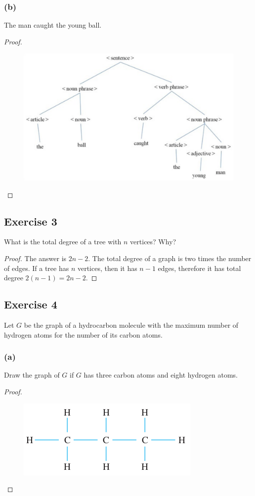 \documentclass[14pt]{extarticle}
\begin{document}
\subsubsection{(b)}
The man caught the young ball.
\begin{proof}
\begin{figure}[ht!]
\centering
\includegraphics[scale=0.25]{../images/10.4.2.b.png}
\end{figure}
\end{proof}

\subsection{Exercise 3}
What is the total degree of a tree with \(n\) vertices? Why?

\begin{proof}
The answer is \(2n - 2\). The total degree of a graph is two times the number of edges. If a tree has \(n\) vertices, then
it has \(n-1\) edges, therefore it has total degree \(2(n-1) = 2n-2\).
\end{proof}

\subsection{Exercise 4}
Let \(G\) be the graph of a hydrocarbon molecule with the maximum number of hydrogen atoms for the number of its carbon 
atoms.

\subsubsection{(a)}
Draw the graph of \(G\) if \(G\) has three carbon atoms and eight hydrogen atoms.

\begin{proof}
\begin{figure}[ht!]
\centering
\includegraphics[scale=0.5]{../images/10.4.4.a.png}
\end{figure}
\end{proof}
\end{document}
